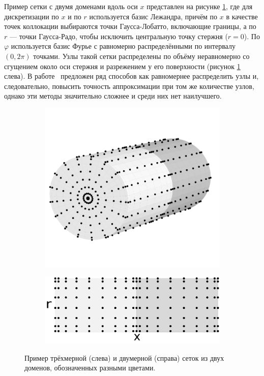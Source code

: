 \documentclass[12pt, a4paper]{report}
\begin{document}
Пример сетки с двумя доменами вдоль оси $x$ представлен на рисунке \ref{fig:grid}, где для дискретизации по $x$ и по $r$ используется базис Лежандра, причём по $x$ в качестве точек коллокации выбираются точки Гаусса-Лобатто, включающие границы, а по $r$ --- точки Гаусса-Радо, чтобы исключить центральную точку стержня ($r=0$). По $\varphi$ используется базис Фурье с равномерно распределёнными по интервалу $(0, 2\pi)$ точками.
Узлы такой сетки распределены по объёму неравномерно со сгущением около оси стержня и разрежением у его поверхности (рисунок \ref{fig:grid} слева). В работе~\cite{Boyd2011} предложен ряд способов как равномернее распределить узлы и, следовательно, повысить точность аппроксимации при том же количестве узлов, однако эти методы значительно сложнее и среди них нет наилучшего.

\begin{figure}[h]
	\centering
	\begin{subfigure}{0.5\textwidth}
		\centering
		\includegraphics[width=.8\textwidth]{figures/Grid3D}
	\end{subfigure}
	\begin{subfigure}{0.48\textwidth}
		\centering
		\includegraphics[width=\textwidth]{figures/Grid2D}
	\end{subfigure}
	\caption{Пример трёхмерной (слева) и двумерной (справа) сеток из двух доменов, обозначенных разными цветами.}
	\label{fig:grid}
\end{figure}
\end{document}

